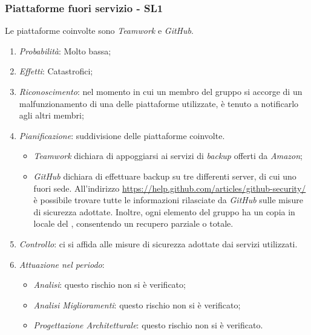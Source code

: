 \subsubsection{Piattaforme fuori servizio - SL1}
Le piattaforme coinvolte sono \textit{Teamwork} e \textit{GitHub}.
\begin{enumerate}
\item \textit{Probabilit\`a}: Molto bassa;
\item \textit{Effetti}: Catastrofici;
\item \textit{Riconoscimento}: nel momento in cui un membro del gruppo si accorge di un malfunzionamento di una delle piattaforme utilizzate, è tenuto a notificarlo agli altri membri;
\item \textit{Pianificazione}: suddivisione delle piattaforme coinvolte.
  \begin{itemize}
    \item \textit{Teamwork} dichiara di appoggiarsi ai servizi di \textit{backup} offerti da \textit{Amazon};
    \item \textit{GitHub} dichiara di effettuare backup su tre differenti server, di cui uno fuori sede. All'indirizzo \href{https://help.github.com/articles/github-security/}{https://help.github.com/articles/github-security/} \`e possibile trovare tutte le informazioni rilasciate da \textit{GitHub} sulle misure di sicurezza adottate. Inoltre, ogni elemento del gruppo ha un copia in locale del , consentendo un recupero parziale o totale.
  \end{itemize}
\item \textit{Controllo}: ci si affida alle misure di sicurezza adottate dai servizi utilizzati.
\item \textit{Attuazione nel periodo}: 
	\begin{itemize}
	\item \textit{Analisi}: questo rischio non si è verificato;
	\item \textit{Analisi Miglioramenti}: questo rischio non si è verificato;
	\item \textit{Progettazione Architetturale}: questo rischio non si è verificato.
	\end{itemize}
\end{enumerate}

